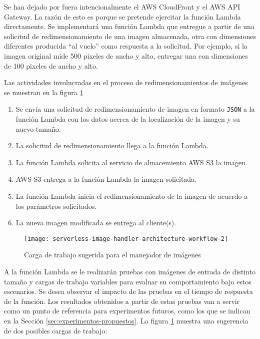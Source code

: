 Se han dejado por fuera intencionalmente el AWS CloudFront y el AWS API Gateway. La razón de esto es porque se pretende ejercitar la función Lambda directamente. Se implementará una función Lambda que entregue a partir de una solicitud de redimensionamiento de una imagen almacenada, otra con dimensiones diferentes producida ``al vuelo'' como respuesta a la solicitud. Por ejemplo, si la imagen original mide 500 pixeles de ancho y alto, entregar una con dimensiones de 100 pixeles de ancho y alto. 

Las actividades involucradas en el proceso de redimensionamientos de imágenes se muestran en la figura \ref{fig:serverless-image-handler-architecture-workflow}
\begin{enumerate}
    \item Se envía una solicitud de redimensionamiento de imagen en formato \texttt{JSON} a la función Lambda con los datos acerca de la localización de la imagen y su nuevo tamaño.
    \item La solicitud de redimensionamiento llega a la función Lambda.
    \item La función Lambda solicita al servicio de almacemiento AWS S3 la imagen.
    \item AWS S3 entrega a la función Lambda la imagen solicitada.
    \item La función Lambda inicia el redimensionamiento de la imagen de acuerdo a los parámetros solicitados.
    \item La nueva imagen modificada se entrega al cliente(s).
\end{enumerate}

\begin{figure}[h]
  \centering
  \texttt{[image: serverless-image-handler-architecture-workflow-2]}
  \caption[Carga de trabajo sugerida para el manejador de imágenes]{Carga de trabajo sugerida para el manejador de imágenes}
  \label{fig:serverless-image-handler-architecture-workflow}
\end{figure}


A la función Lambda se le realizarán pruebas con imágenes de entrada de distinto tamaño y cargas de trabajo variables para evaluar su comportamiento bajo estos escenarios. Se desea observar el impacto de las pruebas en el tiempo de respuesta de la función. Los resultados obtenidos a partir de estas pruebas van a servir como un punto de referencia para experimentos futuros, como los que se indican en la Sección \ref{sec:experimentos-propuestos}. La figura \ref{fig:serverless-image-handler-architecture-workflow} muestra una sugerencia de dos posibles cargas de trabajo: 

